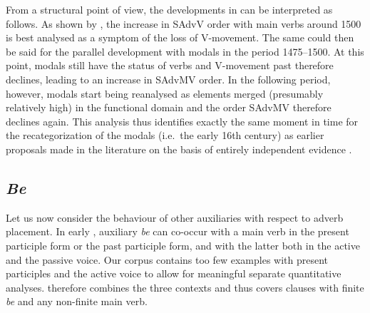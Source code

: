 \documentclass[output=paper]{langsci/langscibook}
\begin{document}
From a structural point of view, the developments in  can be
interpreted as follows. As shown by \citet{HaeIhs2016}, the increase in SAdvV
order with main verbs around 1500 is best analysed as a symptom of the loss of
V-movement. The same could then be said for the parallel development with
modals in the period 1475--1500. At this point, modals still have the status of
verbs and V-movement past  therefore declines, leading to an increase in
{SAdvMV} order. In the following period, however, modals start being reanalysed
as elements merged (presumably relatively high) in the functional domain and
the order SAdvMV therefore declines again. This analysis thus identifies
exactly the same moment in time for the recategorization of the modals (i.e.\
the early 16th century) as earlier proposals made in the literature on the
basis of entirely independent evidence \parencites[cf.\
e.g.][110]{Lightfoot1979}[31]{Lightfoot2006b}[310f.]{Roberts1993}.
%

\subsection{\emph{Be}}

Let us now consider the behaviour of other auxiliaries with respect to adverb
placement. In early , auxiliary \emph{be} can co-occur with a main
verb in the present participle form or the past participle form, and with the
latter both in the active and the passive voice. Our corpus contains too few
examples with present participles and the active voice to allow for meaningful
separate quantitative analyses. \Cref{tab:key:09.2} therefore combines the three
contexts and thus covers clauses with finite \emph{be} and any non-finite
main verb.
\end{document}
